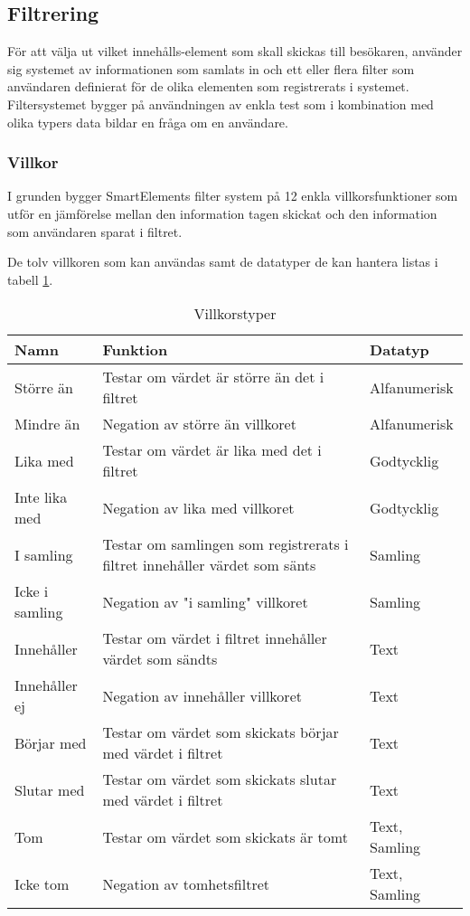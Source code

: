 \subsection{Filtrering}


För att välja ut vilket innehålls-element som skall skickas till besökaren, använder sig systemet av informationen som samlats in och ett eller flera filter som användaren definierat för de olika elementen som registrerats i systemet. Filtersystemet bygger på användningen av enkla test som i kombination med olika typers data bildar en fråga om en användare.

\subsubsection{Villkor}

I grunden bygger SmartElements filter system på 12 enkla villkorsfunktioner som utför en jämförelse mellan den information tagen skickat och den information som användaren sparat i filtret.

De tolv villkoren som kan användas samt de datatyper de kan hantera listas i tabell \ref{table:villkor}.

\begin{table}
    \begin{tabular}{|l|p{8cm}|l|}
    \hline
    Namn & Funktion & Datatyp \\
    \hline
    Större än & Testar om värdet är större än det i filtret & Alfanumerisk \\
    \hline
    Mindre än & Negation av större än villkoret & Alfanumerisk \\
    \hline
    Lika med & Testar om värdet är lika med det i filtret & Godtycklig \\
    \hline
    Inte lika med & Negation av lika med villkoret & Godtycklig \\
    \hline
    I samling & Testar om samlingen som registrerats i filtret innehåller värdet som sänts & Samling \\
    \hline
    Icke i samling & Negation av "i samling" villkoret & Samling \\
    \hline
    Innehåller & Testar om värdet i filtret innehåller värdet som sändts & Text \\
    \hline
    Innehåller ej & Negation av innehåller villkoret & Text \\
    \hline
    Börjar med & Testar om värdet som skickats börjar med värdet i filtret & Text \\
    \hline
    Slutar med & Testar om värdet som skickats slutar med värdet i filtret & Text \\
    \hline
    Tom & Testar om värdet som skickats är tomt & Text, Samling \\
    \hline
    Icke tom & Negation av tomhetsfiltret & Text, Samling \\
    \hline
    \end{tabular}
    \caption{Villkorstyper}
    \label{table:villkor}
\end{table}

